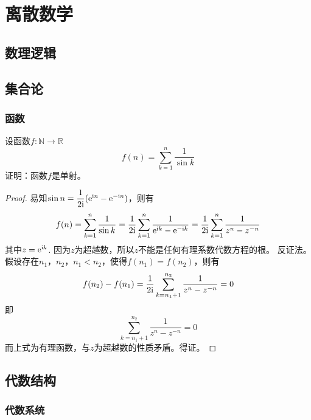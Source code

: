 \chapter{离散数学}

\section{数理逻辑}

\section{集合论}

\subsection{函数}

\begin{proposition}

    设函数$f : \mathbb{N} \to \mathbb{R}$
    \[f(n) = \sum\limits_{k = 1}^{n}{\dfrac{1}{\sin{k}}}\]
    证明：函数$f$是单射。

\end{proposition}

\begin{proof}

    易知$\sin{n} = \dfrac{1}{2\mathrm{i}}(\mathrm{e}^{\mathrm{i} n} - \mathrm{e}^{-\mathrm{i} n})$，则有
    \[f(n) = \sum\limits_{k = 1}^{n}{\dfrac{1}{\sin{k}}} = \dfrac{1}{2\mathrm{i}}\sum\limits_{k = 1}^{n}{\dfrac{1}{\mathrm{e}^{\mathrm{i} k} - \mathrm{e}^{-\mathrm{i} k}}} = \dfrac{1}{2\mathrm{i}}\sum\limits_{k = 1}^{n}{\dfrac{1}{z^n - z^{-n}}}\]
    其中$z = \mathrm{e}^{\mathrm{i} k}$. 因为$z$为超越数，所以$z$不能是任何有理系数代数方程的根。
    反证法。假设存在$n_1$，$n_2$，$n_1 < n_2$，使得$f(n_1) = f(n_2)$，则有
    \[f(n_2) - f(n_1) = \dfrac{1}{2\mathrm{i}}\sum\limits_{k = n_1 + 1}^{n_2}{\dfrac{1}{z^n - z^{-n}}} = 0\]
    即
    \[\sum\limits_{k = n_1 + 1}^{n_2}{\dfrac{1}{z^n - z^{-n}}} = 0\]
    而上式为有理函数，与$z$为超越数的性质矛盾。得证。
    
\end{proof}

\section{代数结构}

\subsection{代数系统}

